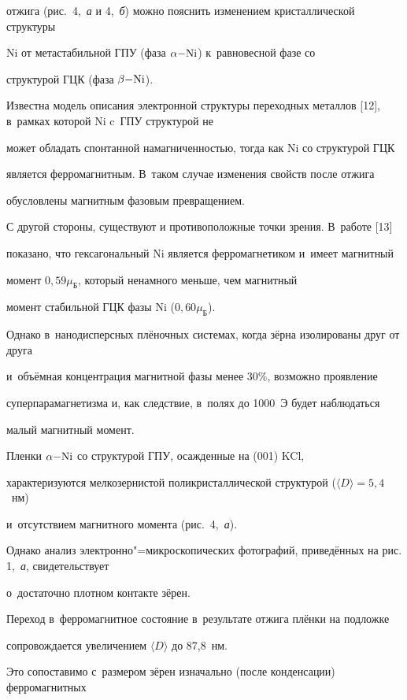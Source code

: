 отжига (рис.~4,~{\sl а} и 4,~{\sl б}) можно пояснить изменением кристаллической структуры

Ni от метастабильной ГПУ (фаза $\alpha \rm{-}Ni$) к~равновесной фазе со

структурой ГЦК (фаза $\beta \rm{-}Ni$).

Известна модель описания электронной структуры переходных металлов [12], в~рамках которой Ni c~ГПУ структурой не

может обладать спонтанной намагниченностью, тогда как Ni со структурой ГЦК

является ферромагнитным. В~таком случае изменения свойств после отжига

обусловлены магнитным фазовым превращением.



С другой стороны, существуют и противоположные точки зрения. В~работе [13]

показано, что гексагональный Ni является ферромагнетиком и~имеет магнитный

момент $0,59 \mu _{\text{Б}}$, который ненамного меньше, чем магнитный

момент стабильной ГЦК фазы Ni ($0,60 \mu _{\text{Б}}$).

Однако в~нанодисперсных плёночных системах, когда зёрна изолированы друг от друга

и~объёмная концентрация магнитной фазы менее 30{\%}, возможно проявление

суперпарамагнетизма и, как следствие, в~полях до 1000~Э будет наблюдаться

малый магнитный момент.



Пленки $\alpha \rm{-}Ni$ со структурой ГПУ, осажденные на (001) KCl,

характеризуются мелкозернистой поликристаллической структурой ($\langle D \rangle  = 5,4$~нм)

и~отсутствием магнитного момента (рис.~4,~{\sl а}).

Однако анализ электронно"=микроскопических фотографий, приведённых на рис. 1,~{\sl а}, свидетельствует

о~достаточно плотном контакте зёрен.

Переход в~ферромагнитное состояние в~результате отжига плёнки на подложке

сопровождается увеличением $\langle D \rangle $ до 87,8~нм.

Это сопоставимо с~размером зёрен изначально (после конденсации) ферромагнитных

